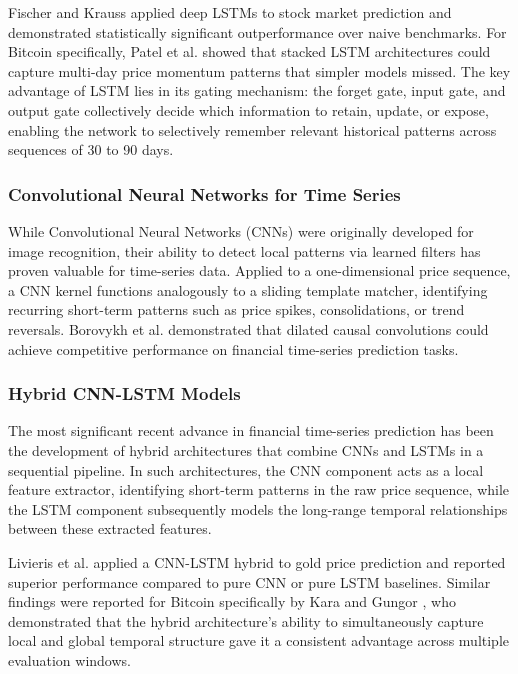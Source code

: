 \documentclass[12pt]{article}
\begin{document}
Fischer and Krauss \cite{fischer2018} applied deep LSTMs to stock market prediction and demonstrated statistically significant outperformance over naive benchmarks. For Bitcoin specifically, Patel et al. \cite{patel2020} showed that stacked LSTM architectures could capture multi-day price momentum patterns that simpler models missed. The key advantage of LSTM lies in its gating mechanism: the forget gate, input gate, and output gate collectively decide which information to retain, update, or expose, enabling the network to selectively remember relevant historical patterns across sequences of 30 to 90 days.

\subsubsection{Convolutional Neural Networks for Time Series}

While Convolutional Neural Networks (CNNs) were originally developed for image recognition, their ability to detect local patterns via learned filters has proven valuable for time-series data. Applied to a one-dimensional price sequence, a CNN kernel functions analogously to a sliding template matcher, identifying recurring short-term patterns such as price spikes, consolidations, or trend reversals. Borovykh et al. \cite{borovykh2017} demonstrated that dilated causal convolutions could achieve competitive performance on financial time-series prediction tasks.

\subsubsection{Hybrid CNN-LSTM Models}

The most significant recent advance in financial time-series prediction has been the development of hybrid architectures that combine CNNs and LSTMs in a sequential pipeline. In such architectures, the CNN component acts as a local feature extractor, identifying short-term patterns in the raw price sequence, while the LSTM component subsequently models the long-range temporal relationships between these extracted features.

Livieris et al. \cite{livieris2020} applied a CNN-LSTM hybrid to gold price prediction and reported superior performance compared to pure CNN or pure LSTM baselines. Similar findings were reported for Bitcoin specifically by Kara and Gungor \cite{kara2022}, who demonstrated that the hybrid architecture's ability to simultaneously capture local and global temporal structure gave it a consistent advantage across multiple evaluation windows.
\end{document}
